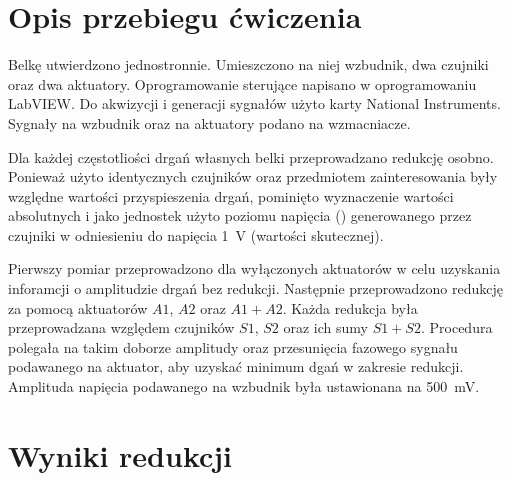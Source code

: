 \documentclass[polish,a4paper,11pt]{mwart}
\let\Oldsection\section
\renewcommand{\section}{\FloatBarrier\Oldsection}
\begin{document}
  \section{Opis przebiegu ćwiczenia}

  Belkę utwierdzono jednostronnie. Umieszczono na niej wzbudnik, dwa czujniki
  oraz dwa aktuatory. Oprogramowanie sterujące napisano w oprogramowaniu
  LabVIEW\textregistered. Do akwizycji i generacji sygnałów użyto karty
  National Instruments\textregistered. Sygnały na wzbudnik oraz na aktuatory
  podano na wzmacniacze. 

  Dla każdej częstotliości drgań własnych belki przeprowadzano redukcję osobno.
  Ponieważ użyto identycznych czujników oraz przedmiotem zainteresowania były
  względne wartości przyspieszenia drgań, pominięto wyznaczenie wartości
  absolutnych i jako jednostek użyto poziomu napięcia (\si{\decibelV})
  generowanego przez czujniki w odniesieniu do napięcia \SI{1}{\volt} (wartości
  skutecznej). 

  Pierwszy pomiar przeprowadzono dla wyłączonych aktuatorów w celu uzyskania
  inforamcji o amplitudzie drgań bez redukcji. Następnie przeprowadzono
  redukcję za pomocą aktuatorów $A1$, $A2$ oraz $A1+A2$. Każda redukcja była
  przeprowadzana względem czujników $S1$, $S2$ oraz ich sumy $S1+S2$.
  Procedura polegała na takim doborze amplitudy oraz
  przesunięcia fazowego sygnału podawanego na aktuator, aby uzyskać minimum
  dgań w zakresie redukcji. Amplituda napięcia podawanego na wzbudnik była
  ustawionana na \SI{500}{\milli\volt}.

  \section{Wyniki redukcji}
  
\end{document}
